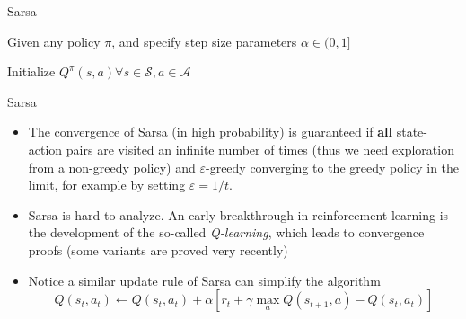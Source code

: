 \documentclass[handout]{beamer}
\begin{document}
\begin{frame}{Sarsa}
\small

\begin{algorithm}[H]
	\caption{Sarsa for estimating $Q^{\pi}$}
	Given any policy $\pi$, and specify step size parameters $\alpha \in (0, 1]$
	
	Initialize $Q^{\pi}(s, a) \forall s\in \mathcal{S}, a\in \mathcal{A}$
	
\end{algorithm}

\end{frame}

\begin{frame}{Sarsa}
\small
\begin{itemize}[<+(1)->]
\item The convergence of Sarsa (in high probability) is guaranteed if \textbf{all} state-action pairs are visited an infinite number of times (thus we need exploration from a non-greedy policy) and $\varepsilon$-greedy converging to the greedy policy in the limit, for example by setting $\varepsilon = 1/t$.

\item Sarsa is hard to analyze. An early breakthrough in reinforcement learning is the development of the so-called \textit{Q-learning}, which leads to convergence proofs (some variants are proved very recently)
\item Notice a similar update rule of Sarsa can simplify the algorithm
$$ Q(s_t, a_t) \leftarrow Q(s_t, a_t) + \alpha \left[ r_t + \gamma \max_a Q(s_{t+1}, a) - Q(s_t, a_t)\right] $$
\end{itemize}
\end{frame}
\end{document}
